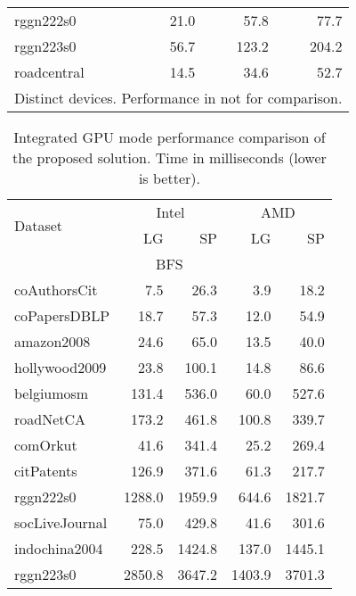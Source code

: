 \begin{table}[tbp]
\begin{center}
\begin{tabular}{|l|r|r|r|}
        \rowcolor{black!2 } rggn222s0&21.0&57.8&77.7\\
        \rowcolor{black!10} rggn223s0&56.7&123.2&204.2\\
        \rowcolor{black!2 } roadcentral&14.5&34.6&52.7\\
        \hline
        \hline
        \multicolumn{4}{l}{Distinct devices. Performance in not for comparison.} \\
        \end{tabular}
        \label{rq2_table}
    \end{center}
    \end{table}
    
    \begin{table}[tbp]
    \caption{Integrated GPU mode performance comparison of the proposed solution. Time in milliseconds (lower is better).} 
    \begin{center}
        \begin{tabular}{|l|r|r|r|r|}
        \hline
        \multirow{2}{*}{Dataset} & \multicolumn{2}{c|}{Intel} & \multicolumn{2}{c|}{AMD} \\
        \cline{2-5}
        & LG & SP & LG & SP \\
        \hline
        \hline
        \multicolumn{5}{|c|}{BFS} \\
        \hline
        \rowcolor{black!10} coAuthorsCit&7.5&26.3&3.9&18.2\\
        \rowcolor{black!2 } coPapersDBLP&18.7&57.3&12.0&54.9\\
        \rowcolor{black!10} amazon2008&24.6&65.0&13.5&40.0\\
        \rowcolor{black!2 } hollywood2009&23.8&100.1&14.8&86.6\\
        \rowcolor{black!10} belgiumosm&131.4&536.0&60.0&527.6\\
        \rowcolor{black!2 } roadNetCA&173.2&461.8&100.8&339.7\\
        \rowcolor{black!10} comOrkut&41.6&341.4&25.2&269.4\\
        \rowcolor{black!2 } citPatents&126.9&371.6&61.3&217.7\\
        \rowcolor{black!10} rggn222s0&1288.0&1959.9&644.6&1821.7\\
        \rowcolor{black!2 } socLiveJournal&75.0&429.8&41.6&301.6\\
        \rowcolor{black!10} indochina2004&228.5&1424.8&137.0&1445.1\\
        \rowcolor{black!2 } rggn223s0&2850.8&3647.2&1403.9&3701.3\\

\end{tabular}
\end{center}
\end{table}
